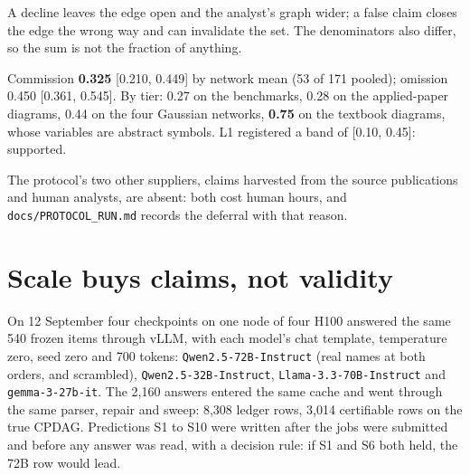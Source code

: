 A decline leaves the edge open and the analyst's graph wider; a false claim closes the edge the wrong
way and can invalidate the set. The denominators also differ, so the sum is not the fraction of
anything.

\begin{medido}
Commission \textbf{0.325} [0.210, 0.449] by network mean (53 of 171 pooled); omission 0.450 [0.361,
0.545]. By tier: 0.27 on the benchmarks, 0.28 on the applied-paper diagrams, 0.44 on the four Gaussian
networks, \textbf{0.75} on the textbook diagrams, whose variables are abstract symbols. L1 registered a band of
[0.10, 0.45]: supported.
\end{medido}

The protocol's two other suppliers, claims harvested from the source publications and human analysts,
are absent: both cost human hours, and \texttt{docs/PROTOCOL\_RUN.md} records the deferral with that
reason.


\begin{antes}
\end{antes}

\section{Scale buys claims, not validity}\label{sec:sup-scale}

On 12 September four checkpoints on one node of four H100 answered the same 540 frozen items through
vLLM, with each model's chat template, temperature zero, seed zero and 700 tokens:
\texttt{Qwen2.5-72B-Instruct} (real names at both orders, and scrambled), \texttt{Qwen2.5-32B-Instruct},
\texttt{Llama-3.3-70B-Instruct} and \texttt{gemma-3-27b-it}. The 2,160 answers entered the same cache
and went through the same parser, repair and sweep: 8,308 ledger rows, 3,014 certifiable
rows on the true CPDAG. Predictions S1 to S10 were written after the jobs were submitted and before any answer was read,
with a decision rule: if S1 and S6 both held, the 72B row would lead.


